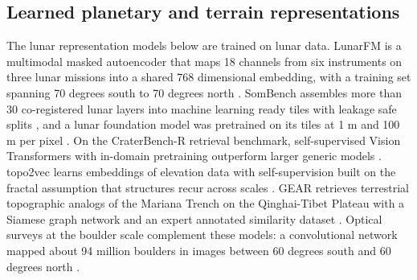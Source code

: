\subsection{Learned planetary and terrain representations}

The lunar representation models below are trained on lunar data. LunarFM is a multimodal
masked autoencoder that maps 18 channels from six instruments on three lunar missions into a
shared 768 dimensional embedding, with a training set spanning 70 degrees south to 70 degrees
north \citep{gironamata2026}. SomBench assembles more than 30 co-registered lunar layers into
machine learning ready tiles with leakage safe splits \citep{patil2026}, and a lunar foundation
model was pretrained on its tiles at 1 m and 100 m per pixel \citep{fraccaro2026}. On the CraterBench-R retrieval benchmark, self-supervised Vision Transformers with in-domain pretraining outperform larger generic models \citep{fang2026}. topo2vec
learns embeddings of elevation data with self-supervision built on the fractal assumption that
structures recur across scales \citep{kavitzky2021}. GEAR retrieves terrestrial topographic analogs
of the Mariana Trench on the Qinghai-Tibet Plateau with a Siamese graph network and an expert
annotated similarity dataset \citep{liu2026}. Optical surveys at the boulder scale complement
these models: a convolutional network mapped about 94 million boulders in images between
60 degrees south and 60 degrees north \citep{aussel2025}. 
